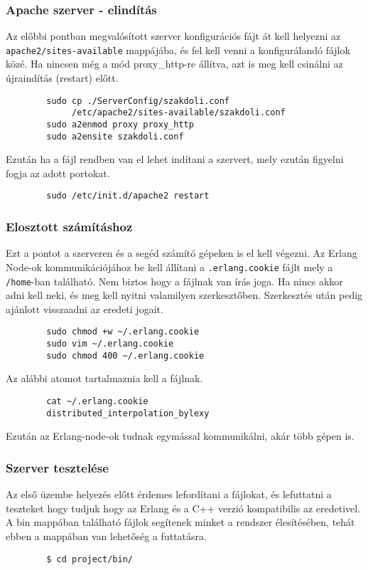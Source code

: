 \subsubsection{Apache szerver - elindítás}
	Az előbbi pontban megvalósított szerver konfigurációs fájt át kell helyezni az \\ \texttt{apache2/sites-available} mappájába, és fel kell venni a konfigurálandó fájlok közé. Ha nincsen még a mód proxy\_http-re állítva, azt is meg kell csinálni az újraindítás (restart) előtt. 
	\begin{verbatim}
		sudo cp ./ServerConfig/szakdoli.conf 
		     /etc/apache2/sites-available/szakdoli.conf
		sudo a2enmod proxy proxy_http
		sudo a2ensite szakdoli.conf
	\end{verbatim}
	Ezután ha a fájl rendben van el lehet indítani a szervert, mely ezután figyelni fogja az adott portokat.
	\begin{verbatim}
		sudo /etc/init.d/apache2 restart
	\end{verbatim}

\subsubsection{Elosztott számításhoz}
	Ezt a pontot a szerveren és a segéd számító gépeken is el kell végezni. \newline
	Az Erlang Node-ok kommunikációjához be kell állítani a \texttt{.erlang.cookie} fájlt mely a \texttt{/home}-ban található. 
	Nem biztos hogy a fájlnak van írás joga. Ha nincs akkor adni kell neki, és meg kell nyitni valamilyen szerkesztőben.
	Szerkesztés után pedig ajánlott visszaadni az eredeti jogait.
	\begin{verbatim}
		sudo chmod +w ~/.erlang.cookie
		sudo vim ~/.erlang.cookie
		sudo chmod 400 ~/.erlang.cookie
	\end{verbatim}
	Az alábbi atomot tartalmaznia kell a fájlnak.
	\begin{verbatim}
		cat ~/.erlang.cookie
		distributed_interpolation_bylexy
	\end{verbatim}
	Ezután az Erlang-node-ok tudnak egymással kommunikálni, akár több gépen is.

\subsubsection{Szerver tesztelése}
	Az első üzembe helyezés előtt érdemes lefordítani a fájlokat, és lefuttatni a teszteket hogy tudjuk hogy az Erlang és a C++ verzió kompatibilis az eredetivel. \newline
	A bin mappában található fájlok segítenek minket a rendszer élesítésében, tehát ebben a mappában van lehetőség a futtatásra.  
	\begin{verbatim}
		$ cd project/bin/
	\end{verbatim}


